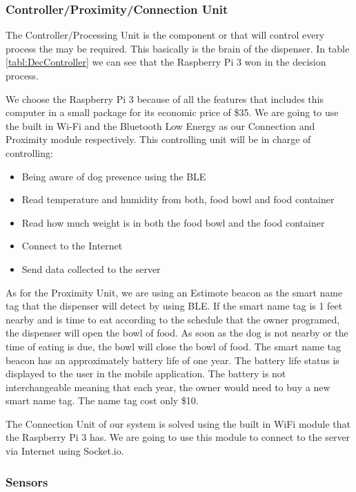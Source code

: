 \documentclass[12pt]{article}
\begin{document}
\subsubsection{Controller/Proximity/Connection Unit}

The Controller/Processing Unit is the component or that will control every process the may be required. This basically is the brain of the dispenser. In table \ref{tabl:DecController} we can see that the Raspberry Pi 3 won in the decision process.

We choose the Raspberry Pi 3 because of all the features that includes this computer in a small package for its economic price of \$35. We are going to use the built in Wi-Fi and the Bluetooth Low Energy as our Connection and Proximity module respectively. This controlling unit will be in charge of controlling:

\begin{itemize}
  \item Being aware of dog presence using the BLE
  \item Read temperature and humidity from both, food bowl and food container
  \item Read how much weight is in both the food bowl and the food container
  \item Connect to the Internet
  \item Send data collected to the server
\end{itemize}

As for the Proximity Unit, we are using an Estimote\cite{K2014} beacon as the smart name tag that the dispenser will detect by using BLE. If the smart name tag is 1 feet nearby and is time to eat according to the schedule that the owner programed, the dispenser will open the bowl of food. As soon as the dog is not nearby or the time of eating is due, the bowl will close the bowl of food. The smart name tag beacon has an approximately battery life of one year. The battery life status is displayed to the user in the mobile application. The battery is not interchangeable meaning that each year, the owner would need to buy a new smart name tag. The name tag cost only \$10.

The Connection Unit of our system is solved using the built in WiFi module that the Raspberry Pi 3 has. We are going to use this module to connect to the server via Internet using Socket.io.


\subsubsection{Sensors}
\end{document}
